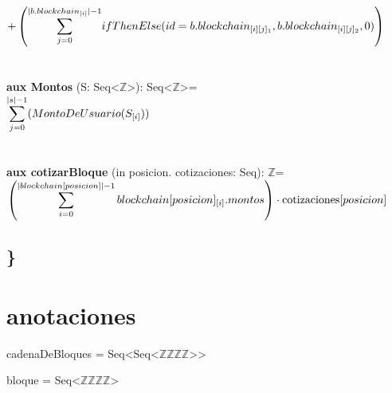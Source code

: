 \documentclass{article}
\newcommand{\Entero}{$\mathds{Z}$}
\newcommand{\tuplaDeCuatroEnteros}{Seq\textless\Entero\texttimes\Entero\texttimes\Entero\texttimes\Entero\textgreater}
\newcommand{\tuplaDeTuplaDeCuatroEnteros}{{Seq\textless Seq\textless\Entero\texttimes\Entero\texttimes\Entero\texttimes\Entero\textgreater\textgreater}}
\begin{document}
        \indent\indent\indent\indent\indent\indent
        $+\left( \mathlarger\sum\limits_{j=0}^{|b.blockchain_{[i]}|-1} ifThenElse (id = b.blockchain_{[i][j]_1}, b.blockchain_{[i][j]_2}, 0)
        \right)$\\\\\\

    \textbf{aux Montos} (S: Seq\textless$\mathds{Z}$\textgreater): Seq\textless$\mathds{Z}$\textgreater = \\

        \indent\indent $\mathlarger\sum\limits_{j=0}^{|s|-1} (MontoDeUsuario(S_{[i]}))$\\\\\\

    \textbf{aux cotizarBloque} (in posicion. cotizaciones: Seq): \Entero =\\

        \indent\indent $\left( \mathlarger{\sum\limits_{i=0}^{|blockchain[posicion]|-1} blockchain[posicion]_{[i]}.montos} \right)\cdot \text{cotizaciones}[posicion]$


\subsection*{\}}

\section*{anotaciones}
cadenaDeBloques = \tuplaDeTuplaDeCuatroEnteros

bloque = \tuplaDeCuatroEnteros
\end{document}
